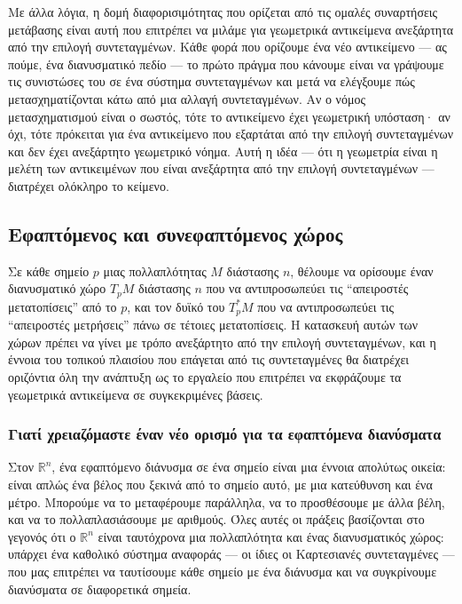 \documentclass[12pt]{article}
\begin{document}
Με άλλα λόγια, η δομή διαφορισιμότητας που ορίζεται από τις ομαλές συναρτήσεις μετάβασης είναι αυτή που επιτρέπει να μιλάμε για γεωμετρικά αντικείμενα ανεξάρτητα από την επιλογή συντεταγμένων. Κάθε φορά που ορίζουμε ένα νέο αντικείμενο --- ας πούμε, ένα διανυσματικό πεδίο --- το πρώτο πράγμα που κάνουμε είναι να γράψουμε τις συνιστώσες του σε ένα σύστημα συντεταγμένων και μετά να ελέγξουμε πώς μετασχηματίζονται κάτω από μια αλλαγή συντεταγμένων. Αν ο νόμος μετασχηματισμού είναι ο σωστός, τότε το αντικείμενο έχει γεωμετρική υπόσταση· αν όχι, τότε πρόκειται για ένα αντικείμενο που εξαρτάται από την επιλογή συντεταγμένων και δεν έχει ανεξάρτητο γεωμετρικό νόημα. Αυτή η ιδέα --- ότι η γεωμετρία είναι η μελέτη των αντικειμένων που είναι ανεξάρτητα από την επιλογή συντεταγμένων --- διατρέχει ολόκληρο το κείμενο.

\subsection{Εφαπτόμενος και συνεφαπτόμενος χώρος}

Σε κάθε σημείο $p$ μιας πολλαπλότητας $M$ διάστασης $n$, θέλουμε να ορίσουμε έναν διανυσματικό χώρο $T_pM$ διάστασης $n$ που να αντιπροσωπεύει τις ``απειροστές μετατοπίσεις'' από το $p$, και τον δυϊκό του $T_p^*M$ που να αντιπροσωπεύει τις ``απειροστές μετρήσεις'' πάνω σε τέτοιες μετατοπίσεις. Η κατασκευή αυτών των χώρων πρέπει να γίνει με τρόπο ανεξάρτητο από την επιλογή συντεταγμένων, και η έννοια του τοπικού πλαισίου που επάγεται από τις συντεταγμένες θα διατρέχει οριζόντια όλη την ανάπτυξη ως το εργαλείο που επιτρέπει να εκφράζουμε τα γεωμετρικά αντικείμενα σε συγκεκριμένες βάσεις.

\subsubsection{Γιατί χρειαζόμαστε έναν νέο ορισμό για τα εφαπτόμενα διανύσματα}

Στον $\mathbb{R}^n$, ένα εφαπτόμενο διάνυσμα σε ένα σημείο είναι μια έννοια απολύτως οικεία: είναι απλώς ένα βέλος που ξεκινά από το σημείο αυτό, με μια κατεύθυνση και ένα μέτρο. Μπορούμε να το μεταφέρουμε παράλληλα, να το προσθέσουμε με άλλα βέλη, και να το πολλαπλασιάσουμε με αριθμούς. Όλες αυτές οι πράξεις βασίζονται στο γεγονός ότι ο $\mathbb{R}^n$ είναι ταυτόχρονα μια πολλαπλότητα και ένας διανυσματικός χώρος: υπάρχει ένα καθολικό σύστημα αναφοράς --- οι ίδιες οι Καρτεσιανές συντεταγμένες --- που μας επιτρέπει να ταυτίσουμε κάθε σημείο με ένα διάνυσμα και να συγκρίνουμε διανύσματα σε διαφορετικά σημεία.
\end{document}
